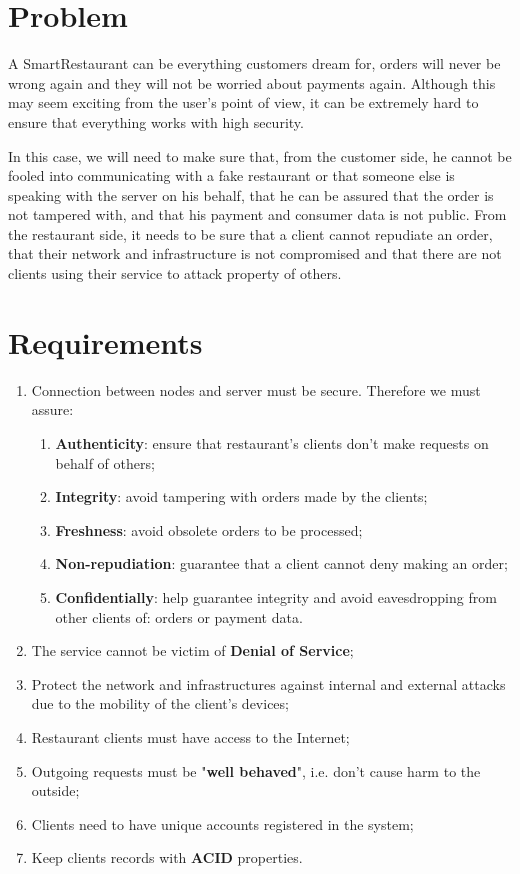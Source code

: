 \documentclass[12pt,paper=a4]{article}
\begin{document}
\section{Problem}
A SmartRestaurant can be everything customers dream for, orders will never be wrong again and they will not be worried about payments again. Although this may seem exciting from the user's point of view, it can be extremely hard to ensure that everything works with high security.

In this case, we will need to make sure that, from the customer side, he cannot be fooled into communicating with a fake restaurant or that someone else is speaking with the server on his behalf, that he can be assured that the order is not tampered with, and that his payment and consumer data is not public. From the restaurant side, it needs to be sure that a client cannot repudiate an order, that their network and infrastructure is not compromised and that there are not clients using their service to attack property of others.

\section{Requirements}
\begin{enumerate}[i]
\item Connection between nodes and server must be secure. Therefore we must assure:
\begin{enumerate}
\item \textbf{Authenticity}: ensure that restaurant’s clients don't make requests on behalf of others;
\item \textbf{Integrity}: avoid tampering with orders made by the clients;
\item \textbf{Freshness}: avoid obsolete orders to be processed;
\item \textbf{Non-repudiation}: guarantee that a client cannot deny making an order;
\item \textbf{Confidentially}: help guarantee integrity and avoid eavesdropping from other clients of: orders or payment data.
\end{enumerate}
\item The service cannot be victim of \textbf{Denial of Service};
\item Protect the network and infrastructures against internal and external attacks due to the mobility of the client's devices;
\item Restaurant clients must have access to the Internet;
\item Outgoing requests must be "\textbf{well behaved}", i.e. don't cause harm to the outside;
\item Clients need to have unique accounts registered in the system;
\item Keep clients records with \textbf{ACID} properties.
\end{enumerate}
\end{document}
